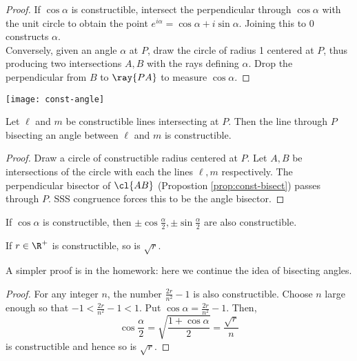 \begin{minipage}[t]{0.65\linewidth}\vspace{0pt}
\begin{proof}
If $\cos\alpha$ is constructible, intersect the perpendicular through $\cos\alpha$ with the unit circle to obtain the point $e^{i\alpha}=\cos\alpha+i\sin\alpha$. Joining this to 0 constructs $\alpha$.\\[5pt]
Conversely, given an angle $\alpha$ at $P$, draw the circle of radius 1 centered at $P$, thus producing two intersections $A,B$ with the rays defining $\alpha$. Drop the perpendicular from $B$ to $\ray{PA}$ to measure $\cos\alpha$.
\end{proof}
\end{minipage}\begin{minipage}[t]{0.35\linewidth}\vspace{0pt}
\flushright\texttt{[image: const-angle]}
\end{minipage}


\begin{prop}\label{prop:const-bisect2}
Let $\ell$ and $m$ be constructible lines intersecting at $P$. Then the line through $P$ bisecting an angle between $\ell$ and $m$ is constructible.
\end{prop}

\begin{proof}
Draw a circle of constructible radius centered at $P$. Let $A,B$ be intersections of the circle with each the lines $\ell,m$ respectively. The perpendicular bisector of $\cl{AB}$ (Propostion \ref{prop:const-bisect}) passes through $P$. SSS congruence forces this to be the angle bisector.
\end{proof}

\begin{cor}
If $\cos\alpha$ is constructible, then $\pm\cos\frac{\alpha}{2},\pm\sin\frac{ 
\alpha}{2}$ are also constructible.
\end{cor}

\begin{prop}
If $r\in\R^+$ is constructible, so is $\sqrt r$.
\end{prop}

A simpler proof is in the homework: here we continue the idea of bisecting angles.

\begin{proof}
For any integer $n$, the number $\frac{2r}{n^2}-1$ is also constructible. Choose $n$ large enough so that $-1<\frac{2r}{n^2}-1<1$. Put $\cos\alpha =\frac{2r}{n^2}-1$. Then, 
\[\cos\frac{\alpha}{2}=\sqrt{\frac{1+\cos\alpha}{2}}=\frac{\sqrt{r}}{n}\] 
is constructible and hence so is $\sqrt{r}$.
\end{proof}

